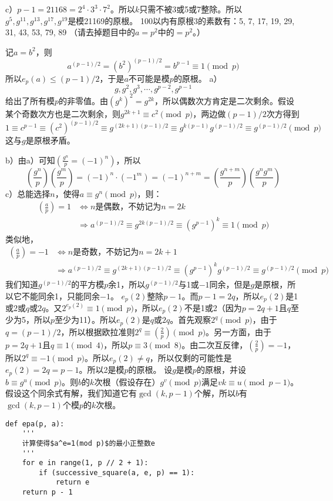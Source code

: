 c）$p-1=21168=2^4\cdot3^3\cdot7^2$。所以$k$只需不被3或5或7整除。所以$g^5,g^{11},g^{13},g^{17},g^{19}$是模21169的原根。
%
\exercise 100以内有原根3的素数有：5, 7, 17, 19, 29, 31, 43, 53, 79, 89
%
\exercise （请去掉题目中的$a=p^2$中的$=p^2$。）\par
记$a=b^2$，则
\[a^{(p-1)/2}=(b^2)^{(p-1)/2}=b^{p-1}\equiv1\pmod p\]
所以$e_p(a)\le(p-1)/2$，于是$a$不可能是模$p$的原根。
%
\exercise a）\[g, g^2,g^3,\cdots, g^{p-2}, g^{p-1}\]
给出了所有模$p$的非零值。由$(g^k)^2=g^{2k}$，所以偶数次方肯定是二次剩余。假设某个奇数次方也是二次剩余，则$g^{2k+1}\equiv c^2\pmod p$，两边做$(p-1)/2$次方得到
\[1\equiv c^{p-1}\equiv (c^2)^{(p-1)/2}\equiv g^{(2k+1)(p-1)/2}\equiv g^{k(p-1)}g^{(p-1)/2}\equiv g^{(p-1)/2}\pmod p\]
这与$g$是原根矛盾。\par
b）由a）可知$(\frac{g^n}{p}=(-1)^n)$，所以
\[\left(\frac{g^n}{p}\right)\left(\frac{g^m}{p}\right)=(-1)^n\cdot(-1^m)=(-1)^{n+m}=\left(\frac{g^{n+m}}{p}\right)\left(\frac{g^ng^m}{p}\right)\]
c）总能选择$n$，使得$a\equiv g^n\pmod p$，则：
\begin{align*}
\left(\frac{a}{p}\right)=1&\Longleftrightarrow n\text{是偶数，不妨记为}n=2k \\
&\Longrightarrow a^{(p-1)/2}\equiv g^{2k(p-1)/2}\equiv(g^{p-1})^k\equiv 1\pmod p
\end{align*}
类似地，
\begin{align*}
\left(\frac{a}{p}\right)=-1&\Longleftrightarrow n\text{是奇数，不妨记为}n=2k+1 \\
&\Longrightarrow a^{(p-1)/2}\equiv g^{(2k+1)(p-1)/2}\equiv(g^{p-1})^kg^{(p-1)/2}\equiv g^{(p-1)/2}\pmod p
\end{align*}
我们知道$g^{(p-1)/2}$的平方模$p$余1，所以$g^{(p-1)/2}$与1或$-1$同余，但是$g$是原根，所以它不能同余1，只能同余$-1$。
%
\exercise $e_p(2)$整除$p-1$。而$p-1=2q$，所以$e_p(2)$是1或2或$q$或$2q$。又$2^{e_p(2)}\equiv1\pmod p$，所以$e_p(2)$不是1或2（因为$p=2q+1$且$q$至少为5，所以$p$至少为11）。所以$e_p(2)$是$q$或$2q$。首先观察$2^q\pmod p$，由于$q=(p-1)/2$，所以根据欧拉准则$2^q\equiv(\frac{2}{p})\pmod p$。另一方面，由于$p=2q+1$且$q\equiv1\pmod4$，所以$p\equiv3\pmod8$。由二次互反律，$\left(\frac{2}{p}\right)=-1$，所以$2^q\equiv-1\pmod p$。所以$e_p(2)\not=q$，所以仅剩的可能性是$e_p(2)=2q=p-1$。所以2是模$p$的原根。
%
\exercise 设$g$是模$p$的原根，并设$b\equiv g^u\pmod p$。则$b$的$k$次根（假设存在）$g^v\pmod p$满足$vk\equiv u\pmod{p-1}$。假设这个同余式有解，我们知道它有$\gcd(k, p-1)$个解，所以$b$有$\gcd(k, p-1)$个模$p$的$k$次根。
%
\exercise 
\begin{lstlisting}
def epa(p, a):
    '''
    计算使得$a^e=1(mod p)$的最小正整数e
    '''
    for e in range(1, p // 2 + 1):
        if (successive_square(a, e, p) == 1):
            return e
    return p - 1
\end{lstlisting}
